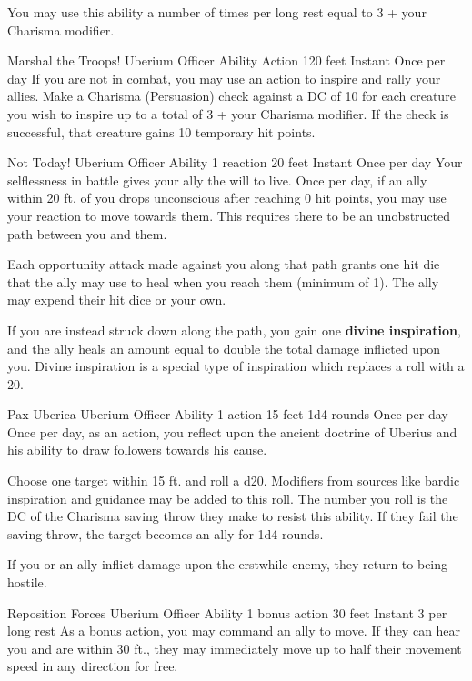 You may use this ability a number of times per long rest
equal to 3 + your Charisma modifier.


\ability%
    {Marshal the Troops!}
    {Uberium Officer Ability}
    {Action}
    {120 feet}
    {Instant}
    {Once per day}
If you are not in combat,
you may use an action to inspire and rally your allies.
Make a Charisma (Persuasion) check against a DC of 10
for each creature you wish to inspire
up to a total of 3 + your Charisma modifier.
If the check is successful,
that creature gains 10 temporary hit points.

\ability%
    {Not Today!}
    {Uberium Officer Ability}
    {1 reaction}
    {20 feet}
    {Instant}
    {Once per day}
Your selflessness in battle gives your ally the will to live.
Once per day, if an ally within 20 ft. of you drops unconscious
after reaching 0 hit points, you may use your reaction
to move towards them.
This requires there to be an unobstructed path between you and them.

Each opportunity attack made against you along that path
grants one hit die that the ally may use to heal
when you reach them (minimum of 1).
The ally may expend their hit dice or your own.

If you are instead struck down along the path,
you gain one \textbf{divine inspiration},
and the ally heals an amount equal to
double the total damage inflicted upon you.
Divine inspiration is a special type of inspiration
which replaces a roll with a 20.


\ability%
    {Pax Uberica}
    {Uberium Officer Ability}
    {1 action}
    {15 feet}
    {1d4 rounds}
    {Once per day}
Once per day, as an action,
you reflect upon the ancient doctrine of Uberius
and his ability to draw followers towards his cause.

Choose one target within 15 ft. and roll a d20.
Modifiers from sources like bardic inspiration and guidance
may be added to this roll.
The number you roll is the DC of the Charisma saving throw
they make to resist this ability.
If they fail the saving throw,
the target becomes an ally for 1d4 rounds.

If you or an ally inflict damage upon the erstwhile enemy,
they return to being hostile.


\ability%
    {Reposition Forces}
    {Uberium Officer Ability}
    {1 bonus action}
    {30 feet}
    {Instant}
    {3 per long rest}
As a bonus action, you may command an ally to move.
If they can hear you and are within 30 ft.,
they may immediately move up to half their movement speed
in any direction for free.

